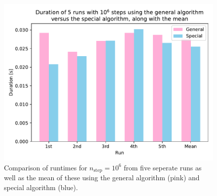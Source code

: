 \documentclass[english,notitlepage]{revtex4-1}  %
\begin{document}
\begin{figure}[h!]
    \centering 
    \includegraphics[scale=0.80]{../data/runtime_comparison_1000000.pdf} %
    \caption{Comparison of runtimes for $n_\text{step} = 10^6$ from five seperate runs as well as the mean of these using the general algorithm (pink) and special algorithm (blue).}
    \label{timing 6}
\end{figure}

   
\end{document}
